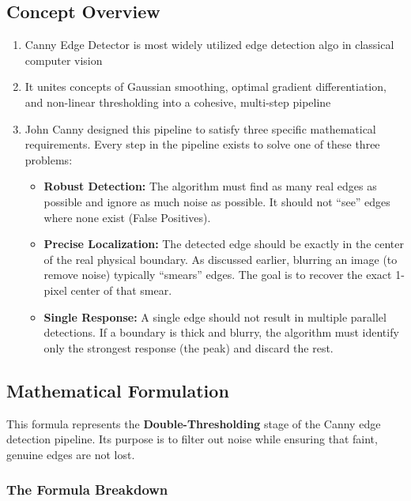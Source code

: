 \documentclass[12pt]{article}
\begin{document}
\subsection{Concept Overview}
\begin{enumerate}
    \item Canny Edge Detector is most widely utilized edge detection algo in classical computer vision
    \item It unites concepts of Gaussian smoothing, optimal gradient differentiation, and non-linear thresholding into a cohesive, multi-step pipeline
    \item John Canny designed this pipeline to satisfy three specific mathematical requirements. Every step in the pipeline exists to solve one of these three problems:
          \begin{itemize}
              \item \textbf{Robust Detection:}
                    The algorithm must find as many real edges as possible and ignore as much noise as possible. It should not ``see'' edges where none exist (False Positives).

              \item \textbf{Precise Localization:}
                    The detected edge should be exactly in the center of the real physical boundary. As discussed earlier, blurring an image (to remove noise) typically ``smears'' edges. The goal is to recover the exact 1-pixel center of that smear.

              \item \textbf{Single Response:}
                    A single edge should not result in multiple parallel detections. If a boundary is thick and blurry, the algorithm must identify only the strongest response (the peak) and discard the rest.
          \end{itemize}
\end{enumerate}

\subsection{Mathematical Formulation}

This formula represents the \textbf{Double-Thresholding} stage of the Canny edge detection pipeline. Its purpose is to filter out noise while ensuring that faint, genuine edges are not lost.

\subsubsection*{The Formula Breakdown}
\end{document}
